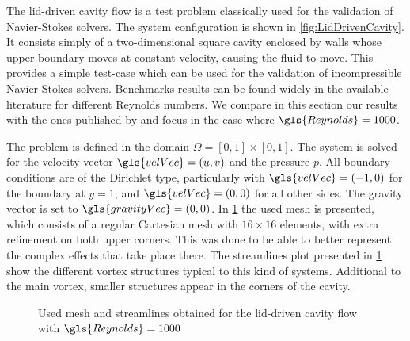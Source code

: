 The lid-driven cavity flow is a test problem classically used for the validation of Navier-Stokes solvers. The system configuration is shown in \cref{fig:LidDrivenCavity}. It consists simply of a two-dimensional square cavity  enclosed by walls whose upper boundary moves at constant velocity, causing the fluid to move. This provides a simple test-case which can be used for the validation of incompressible Navier-Stokes solvers. Benchmarks results can be found widely in the available literature for different Reynolds numbers. We compare in this section our results with the ones published by \cite{botellaBenchmarkSpectralResults1998} and focus in the case where $\gls{Reynolds} = 1000$. 

The problem is defined in the domain $\Omega = [0,1]\times [0,1]$. The system is solved for the velocity vector $\gls{velVec} = (u,v)$ and the pressure $p$. All boundary conditions are of the Dirichlet type, particularly with $\gls{velVec} = (-1,0)$ for the boundary at $y = 1$, and $\gls{velVec} = (0,0)$ for all other sides. The gravity vector is set to $\gls{gravityVec} = (0,0)$.  In \cref{fig:LiddrivenMesh} the used mesh is presented, which consists of a regular Cartesian mesh with $16\times16$ elements, with extra refinement on both upper corners. This was done to be able to better represent the complex effects that take place there. The streamlines plot presented in \cref{fig:LiddrivenMesh} show the different vortex structures typical to this kind of systems. Additional to the main vortex, smaller structures appear in the corners of the cavity. 



	
	\begin{figure}[t]
		\centering
		\pgfplotsset{width=0.35 \textwidth, compat=1.3}	
		\caption{Used mesh and streamlines obtained for the lid-driven cavity flow with $\gls{Reynolds} = 1000$} \label{fig:LiddrivenMesh}
	\end{figure}


